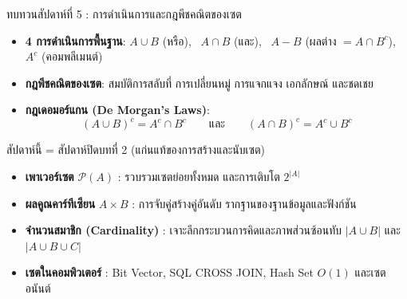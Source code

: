 

\begin{frame}[plain]
  \maketitle
\end{frame}

\begin{frame}{ทบทวนสัปดาห์ที่ 5 : การดำเนินการและกฎพีชคณิตของเซต}
  \begin{itemize}
    \item \textbf{4 การดำเนินการพื้นฐาน}:
          $A \cup B$ (หรือ), \ $A \cap B$ (และ), \ $A - B$ (ผลต่าง $= A \cap B^c$), \ $A^c$ (คอมพลีเมนต์)
    \item \textbf{กฎพีชคณิตของเซต}: สมบัติการสลับที่ การเปลี่ยนหมู่ การแจกแจง เอกลักษณ์ และชดเชย
    \item \textbf{กฎเดอมอร์แกน (De Morgan's Laws)}:
          \[ (A \cup B)^c = A^c \cap B^c \qquad \text{และ} \qquad (A \cap B)^c = A^c \cup B^c \]
  \end{itemize}
  \vspace{0.2em}
  \begin{exampleblock}{สัปดาห์นี้ = สัปดาห์ปิดบทที่ 2 (แก่นแท้ของการสร้างและนับเซต)}
    \begin{itemize}\small
      \item \textbf{เพาเวอร์เซต} $\mathcal{P}(A)$ : รวบรวมเซตย่อยทั้งหมด และการเติบโต $2^{|A|}$
      \item \textbf{ผลคูณคาร์ทีเซียน} $A \times B$ : การจับคู่สร้างคู่อันดับ รากฐานของฐานข้อมูลและฟังก์ชัน
      \item \textbf{จำนวนสมาชิก (Cardinality)} : เจาะลึกกระบวนการคิดและภาพส่วนซ้อนทับ $|A \cup B|$ และ $|A \cup B \cup C|$
      \item \textbf{เซตในคอมพิวเตอร์} : Bit Vector, SQL CROSS JOIN, Hash Set $O(1)$ และเซตอนันต์
    \end{itemize}
  \end{exampleblock}
\end{frame}


